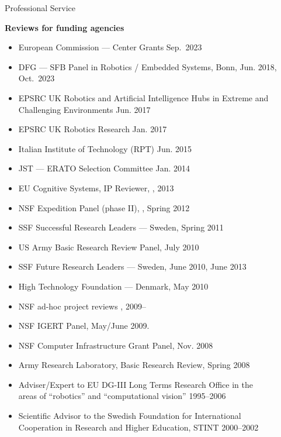 \documentclass{article}
\begin{document}
\begin{cv}
\begin{cvlist}{Professional Service}
\item {\bf Reviews for funding agencies}
  \begin{itemize}
  \item European Commission --- Center Grants \cftdotfill{\cftdotsep} Sep.~2023
  \item DFG --- SFB Panel in Robotics / Embedded Systems,
    Bonn,\cftdotfill{\cftdotsep} Jun. 2018, Oct.~2023
  \item EPSRC UK Robotics and Artificial Intelligence Hubs in Extreme
    and Challenging Environments \cftdotfill{\cftdotsep} Jun. 2017
  \item EPSRC UK Robotics Research  \cftdotfill{\cftdotsep} Jan. 2017
  \item Italian Institute of Technology (RPT) \cftdotfill{\cftdotsep}
    Jun. 2015
 \item JST --- ERATO Selection Committee \cftdotfill{\cftdotsep} Jan. 2014
 \item EU Cognitive Systems, IP Reviewer, \cftdotfill{\cftdotsep}, 2013
 \item NSF Expedition Panel (phase II), \cftdotfill{\cftdotsep},
   Spring 2012
 \item SSF Successful Research Leaders --- Sweden,
   \cftdotfill{\cftdotsep} Spring 2011
 \item US Army Basic Research Review Panel, \cftdotfill{\cftdotsep} July 2010
 \item SSF Future Research Leaders --- Sweden, \cftdotfill{\cftdotsep} June 2010, June 2013
 \item High Technology Foundation --- Denmark, \cftdotfill{\cftdotsep}  May 2010
 \item NSF ad-hoc project reviews \cftdotfill{\cftdotsep}, 2009--
 \item NSF IGERT Panel, \cftdotfill{\cftdotsep} May/June 2009.
 \item NSF Computer Infrastructure Grant Panel,  \cftdotfill{\cftdotsep} Nov. 2008
 \item Army Research Laboratory, Basic Research Review, \cftdotfill{\cftdotsep}  Spring 2008
 \item Adviser/Expert to EU DG-III Long Terms Research Office in the\\
   areas of ``robotics'' and ``computational vision''
   \cftdotfill{\cftdotsep}  1995--2006
 \item Scientific Advisor to the Swedish Foundation for International\\
   Cooperation in Research and Higher Education,  STINT
   \cftdotfill{\cftdotsep}  2000--2002

\end{itemize}
\end{cvlist}
\end{cv}
\end{document}
